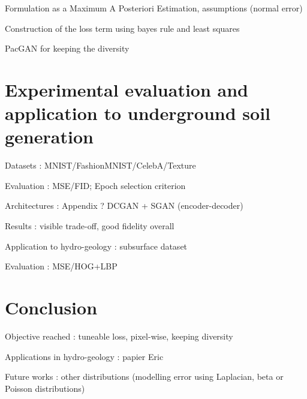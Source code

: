 Formulation as a Maximum A Posteriori Estimation, assumptions (normal error)

Construction of the loss term using bayes rule and least squares 

PacGAN for keeping the diversity

\section{Experimental evaluation and application to underground soil generation}

Datasets : MNIST/FashionMNIST/CelebA/Texture

Evaluation : MSE/FID; Epoch  selection criterion

Architectures : Appendix ? DCGAN + SGAN (encoder-decoder)

Results : visible trade-off, good fidelity overall

Application to hydro-geology : subsurface dataset

Evaluation : MSE/HOG+LBP

\section{Conclusion}

Objective reached : tuneable loss, pixel-wise, keeping diversity

Applications in hydro-geology : papier Eric

Future works : other distributions (modelling error using Laplacian, beta or Poisson distributions)
